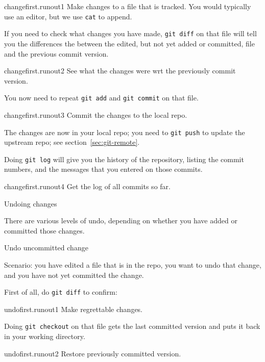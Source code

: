 \begin{gitstep}{changefirst.runout1}
  Make changes to a file that is tracked.
  You would typically use an editor, but we use \lstinline{cat} to append.
\end{gitstep}

If you need to check what changes you have made, \lstinline{git diff} on that file
will tell you the differences the between the edited, but not yet added or committed,
file and the previous commit version.

\begin{gitstep}{changefirst.runout2}
  See what the changes were wrt the previously commit version.
\end{gitstep}

You now need to repeat \lstinline{git add} and \lstinline{git commit} on that file.

\begin{gitstep}{changefirst.runout3}
  Commit the changes to the local repo.
\end{gitstep}

The changes are now in your local repo;
you need to \lstinline{git push} to update the upstream repo;
see section~\ref{sec:git-remote}.

Doing \lstinline{git log} will give you the history of the repository,
listing the commit numbers, and the messages that you entered on those commits.

\begin{gitstep}{changefirst.runout4}
  Get the log of all commits so far.
\end{gitstep}

\newpage
{} {Undoing changes}

There are various levels of undo, depending on whether you have added or committed
those changes.

 {Undo uncommitted change}

Scenario: you have edited a file that is in the repo,
you want to undo that change,
and you have not yet committed the change.

First of all, do \lstinline{git diff} to confirm:

\begin{gitstep}{undofirst.runout1}
  Make regrettable changes.
\end{gitstep}

Doing \lstinline{git checkout} on that file gets the last committed version
and puts it back in your working directory.

\begin{gitstep}{undofirst.runout2}
  Restore previously committed version.
\end{gitstep}


